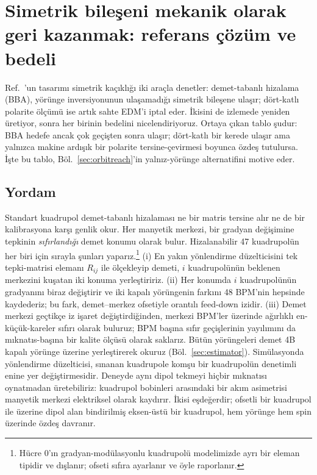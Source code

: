 \documentclass[aps,prab,reprint,superscriptaddress,nofootinbib]{revtex4-2}
\begin{document}

\section{Simetrik bileşeni mekanik olarak geri kazanmak: referans çözüm ve bedeli}
\label{sec:bba}

Ref.~\cite{omarov}'un tasarımı simetrik kaçıklığı iki araçla denetler:
demet-tabanlı hizalama (BBA), yörünge inversiyonunun ulaşamadığı simetrik bileşene
ulaşır; dört-katlı polarite ölçümü ise artık sahte EDM'i iptal eder. İkisini de
izlemede yeniden üretiyor, sonra her birinin bedelini nicelendiriyoruz. Ortaya çıkan
tablo şudur: BBA hedefe ancak çok geçişten sonra ulaşır; dört-katlı bir kerede
ulaşır ama yalnızca makine ardışık bir polarite tersine-çevirmesi boyunca özdeş
tutulursa. İşte bu tablo, Böl.~\ref{sec:orbitreach}'in yalnız-yörünge alternatifini
motive eder.

\subsection{Yordam}
\label{sec:bbaproc}

Standart kuadrupol demet-tabanlı hizalaması ne bir matris tersine alır ne de bir
kalibrasyona karşı genlik okur. Her manyetik merkezi, bir gradyan değişimine
tepkinin \emph{sıfırlandığı} demet konumu olarak bulur. Hizalanabilir 47
kuadrupolün her biri için sırayla şunları yaparız.\footnote{Hücre 0'ın
gradyan-modülasyonlu kuadrupolü modelimizde ayrı bir eleman tipidir ve dışlanır;
ofseti sıfıra ayarlanır ve öyle raporlanır.} (i) En yakın yönlendirme düzelticisini
tek tepki-matrisi elemanı $R_{ij}$ ile ölçekleyip demeti, $i$ kuadrupolünün beklenen
merkezini kuşatan iki konuma yerleştiririz. (ii) Her konumda $i$ kuadrupolünün
gradyanını biraz değiştirir ve iki kapalı yörüngenin farkını 48 BPM'nin hepsinde
kaydederiz; bu fark, demet--merkez ofsetiyle orantılı feed-down izidir. (iii) Demet
merkezi geçtikçe iz işaret değiştirdiğinden, merkezi BPM'ler üzerinde ağırlıklı
en-küçük-kareler sıfırı olarak buluruz; BPM başına sıfır geçişlerinin yayılımını da
mıknatıs-başına bir kalite ölçüsü olarak saklarız. Bütün yörüngeleri demet 4B
kapalı yörünge üzerine yerleştirerek okuruz (Böl.~\ref{sec:estimator}). Simülasyonda
yönlendirme düzelticisi, sınanan kuadrupole komşu bir kuadrupolün denetimli enine
yer değiştirmesidir. Deneyde aynı dipol tekmeyi hiçbir mıknatısı oynatmadan
üretebiliriz: kuadrupol bobinleri arasındaki bir akım asimetrisi manyetik merkezi
elektriksel olarak kaydırır. İkisi eşdeğerdir; ofsetli bir kuadrupol ile üzerine
dipol alan bindirilmiş eksen-üstü bir kuadrupol, hem yörünge hem spin üzerinde
özdeş davranır.
\end{document}
